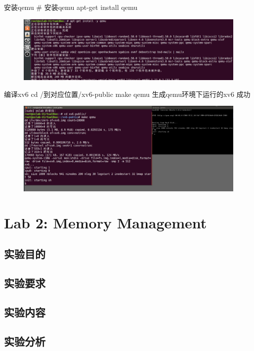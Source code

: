 \documentclass[a4paper,12pt]{report}
\begin{document}
\begin{spacing}{1.5}
安装qemu
\# 安装qemu apt-get install qemu

\begin{figure}[H]
	\centering
	\includegraphics [width=1.0\textwidth]{figure//1.3.png}
\end{figure}

编译xv6
cd /到对应位置/xv6-public
make qemu
生成qemu环境下运行的xv6
成功
\begin{figure}[H]
	\centering
	\includegraphics [width=1.0\textwidth]{figure//1.4.png}
\end{figure}
\end{spacing}



\chapter{ Lab 2: Memory Management}


\begin{spacing}{1.5}
\section{实验目的}

\section{实验要求}

\section{实验内容}

\section{实验分析}

\end{spacing}
\end{document}
